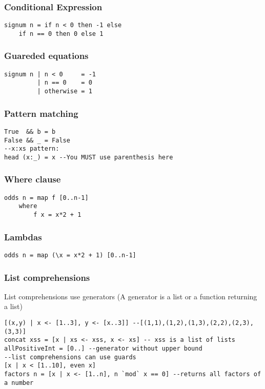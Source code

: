 \documentclass[12pt]{article}
\begin{document}
\subsubsection*{Conditional Expression}
\begin{verbatim}
signum n = if n < 0 then -1 else 
    if n == 0 then 0 else 1
\end{verbatim}

\subsubsection*{Guareded equations}
\begin{verbatim}
signum n | n < 0     = -1
         | n == 0    = 0
         | otherwise = 1
\end{verbatim}

\subsubsection*{Pattern matching}
\begin{verbatim}
True  && b = b
False && _ = False
--x:xs pattern:
head (x:_) = x --You MUST use parenthesis here
\end{verbatim}

\subsubsection*{Where clause}
\begin{verbatim}
odds n = map f [0..n-1]
    where
        f x = x*2 + 1
\end{verbatim}

\subsubsection*{Lambdas}
\begin{verbatim}
odds n = map (\x = x*2 + 1) [0..n-1]
\end{verbatim}

\subsubsection*{List comprehensions}
List comprehensions use generators (A generator is a list or a function returning a list)
\begin{verbatim}
[(x,y) | x <- [1..3], y <- [x..3]] --[(1,1),(1,2),(1,3),(2,2),(2,3),(3,3)]
concat xss = [x | xs <- xss, x <- xs] -- xss is a list of lists
allPositiveInt = [0..] --generator without upper bound
--list comprehensions can use guards
[x | x < [1..10], even x]
factors n = [x | x <- [1..n], n `mod` x == 0] --returns all factors of a number
\end{verbatim}
\end{document}
